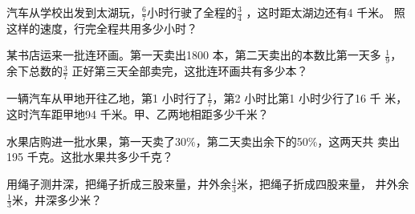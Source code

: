 \begin{example}
    汽车从学校出发到太湖玩，$\frac{6}{7}$小时行驶了全程的$\frac{3}{4}$
，这时距太湖边还有4 千米。
照这样的速度，行完全程共用多少小时？
\end{example}
\vspace{2.5cm}
\begin{example}
    某书店运来一批连环画。第一天卖出1800 本，第二天卖出的本数比第一天多
$\frac{1}{9}$，余下总数的$\frac{3}{7}$ 正好第三天全部卖完，这批连环画共有多少本？
\end{example}
\vspace{2.5cm}
\begin{example}
    一辆汽车从甲地开往乙地，第1 小时行了$\frac{1}{7}$，第2 小时比第1 小时少行了16 千
米，这时汽车距甲地94 千米。甲、乙两地相距多少千米？
\end{example}
\vspace{2.5cm}
\begin{example}
    水果店购进一批水果，第一天卖了30\%，第二天卖出余下的50\%，这两天共
卖出195 千克。这批水果共多少千克？
\end{example}
\vspace{2.5cm}
\begin{example}
    用绳子测井深，把绳子折成三股来量，井外余$\frac{4}{3}$米，把绳子折成四股来量，
井外余$\frac{1}{3}$米，井深多少米？
\end{example}
\vspace{2.5cm}